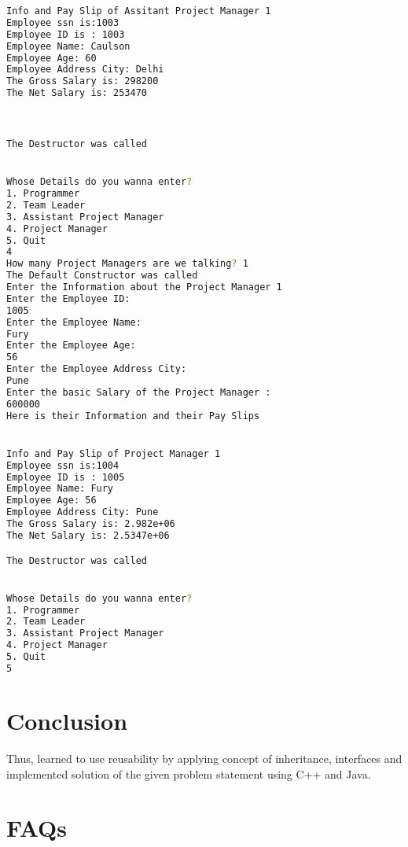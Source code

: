 \documentclass[11pt]{article}
\begin{document}
\begin{lstlisting}[language=bash, caption=C++ Output]
Info and Pay Slip of Assitant Project Manager 1
Employee ssn is:1003
Employee ID is : 1003
Employee Name: Caulson
Employee Age: 60
Employee Address City: Delhi
The Gross Salary is: 298200
The Net Salary is: 253470



The Destructor was called


Whose Details do you wanna enter?
1. Programmer
2. Team Leader
3. Assistant Project Manager
4. Project Manager
5. Quit
4
How many Project Managers are we talking? 1
The Default Constructor was called
Enter the Information about the Project Manager 1
Enter the Employee ID:
1005
Enter the Employee Name:
Fury
Enter the Employee Age:
56
Enter the Employee Address City:
Pune
Enter the basic Salary of the Project Manager :
600000
Here is their Information and their Pay Slips


Info and Pay Slip of Project Manager 1
Employee ssn is:1004
Employee ID is : 1005
Employee Name: Fury
Employee Age: 56
Employee Address City: Pune
The Gross Salary is: 2.982e+06
The Net Salary is: 2.5347e+06

The Destructor was called


Whose Details do you wanna enter?
1. Programmer
2. Team Leader
3. Assistant Project Manager
4. Project Manager
5. Quit
5
\end{lstlisting}

\pagebreak

\section{Conclusion}
Thus, learned to use reusability by applying concept of inheritance, interfaces and
implemented solution of the given problem statement using C++ and Java.

\section{FAQs}
\end{document}
